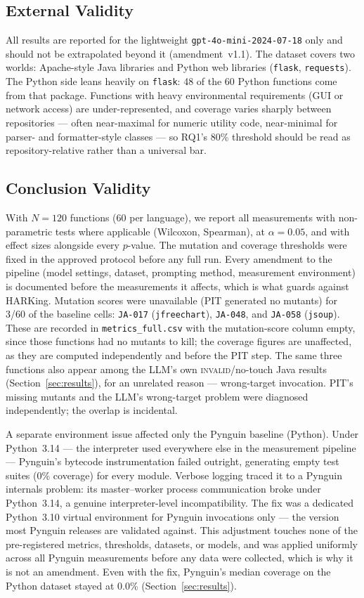 \subsection{External Validity}
All results are reported for the lightweight \texttt{gpt-4o-mini-2024-07-18} only and
should not be extrapolated beyond it (amendment~v1.1). The dataset covers two worlds:
Apache-style Java libraries and Python web libraries (\texttt{flask}, \texttt{requests}).
The Python side leans heavily on \texttt{flask}: 48 of the 60 Python functions come from
that package. Functions with heavy environmental requirements (GUI or network access) are
under-represented, and coverage varies sharply between repositories --- often near-maximal
for numeric utility code, near-minimal for parser- and formatter-style classes --- so
RQ1's 80\% threshold should be read as repository-relative rather than a universal bar.

\subsection{Conclusion Validity}
With $N=120$ functions (60 per language), we report all measurements with non-parametric
tests where applicable (Wilcoxon, Spearman), at $\alpha=0.05$, and with effect sizes
alongside every $p$-value. The mutation and coverage thresholds were fixed in the approved
protocol before any full run. Every amendment to the pipeline (model settings, dataset,
prompting method, measurement environment) is documented before the measurements it
affects, which is what guards against HARKing. Mutation scores were unavailable (PIT
generated no mutants) for 3/60 of the baseline cells: \texttt{JA-017} (\texttt{jfreechart}),
\texttt{JA-048}, and \texttt{JA-058} (\texttt{jsoup}). These are recorded in
\texttt{metrics\_full.csv} with the mutation-score column empty, since those functions had
no mutants to kill; the coverage figures are unaffected, as they are computed independently
and before the PIT step. The same three functions also appear among the LLM's own
\textsc{invalid}/no-touch Java results (Section~\ref{sec:results}), for an unrelated
reason --- wrong-target invocation. PIT's missing mutants and the LLM's wrong-target
problem were diagnosed independently; the overlap is incidental.

A separate environment issue affected only the Pynguin baseline (Python). Under
Python~3.14 --- the interpreter used everywhere else in the measurement pipeline ---
Pynguin's bytecode instrumentation failed outright, generating empty test suites (0\%
coverage) for every module. Verbose logging traced it to a Pynguin internals problem: its
master--worker process communication broke under Python~3.14, a genuine interpreter-level
incompatibility. The fix was a dedicated Python~3.10 virtual environment for Pynguin
invocations only --- the version most Pynguin releases are validated against. This
adjustment touches none of the pre-registered metrics, thresholds, datasets, or models,
and was applied uniformly across all Pynguin measurements before any data were collected,
which is why it is not an amendment. Even with the fix, Pynguin's median coverage on the
Python dataset stayed at 0.0\% (Section~\ref{sec:results}).

